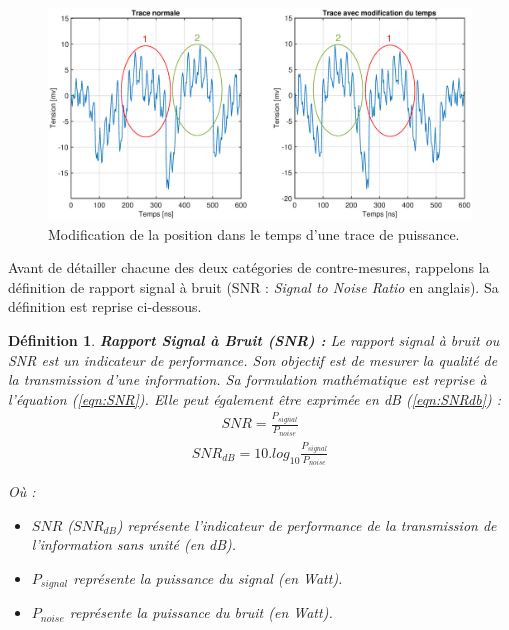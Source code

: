 \documentclass[oneside]{book}
\newtheorem{definition}{Définition}[section]
\begin{document}
\begin{figure}[htbp]
    \centering
    \includegraphics[scale=0.32]{image/trace_Time}
    \caption{Modification de la position dans le temps d'une trace de puissance.}
    \label{fig:trace_Time}
\end{figure}

\hspace{-0.5cm}Avant de détailler chacune des deux catégories de contre-mesures, rappelons la définition de rapport signal à bruit (SNR : \textit{Signal to Noise Ratio} en anglais). Sa définition est reprise ci-dessous. 

\theoremstyle{definition}
\begin{definition}{\textbf{Rapport Signal à Bruit (SNR) :}}
Le rapport signal à bruit ou SNR est un indicateur de performance. Son objectif est de mesurer la qualité de la transmission d'une information. Sa formulation mathématique est reprise à l'équation (\ref{eqn:SNR}). Elle peut également être exprimée en \textit{dB} (\ref{eqn:SNRdb}) : \\

\begin{gather}
	SNR = \frac{P_{signal}}{P_{noise}} \label{eqn:SNR}
\end{gather}
\begin{gather}
	SNR_{dB} = 10.log_{10}\frac{P_{signal}}{P_{noise}} \label{eqn:SNRdb}
\end{gather}

\hspace{-0.5 cm}Où :
\begin{itemize}
\item $SNR$ ($SNR_{dB}$) représente l'indicateur de performance de la transmission de l'information sans unité (en dB).
\item $P_{signal}$ représente la puissance du signal (en \textit{Watt}).
\item $P_{noise}$ représente la puissance du bruit (en \textit{Watt}). \\
\end{itemize}
\end{definition}
\end{document}
